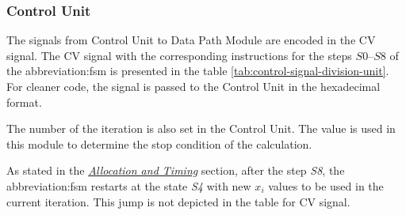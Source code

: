 \documentclass[a4paper, twoside, 11pt]{article}
\newcommand{\fbar}{\FloatBarrier}
\begin{document}
\fbar
\subsubsection{Control Unit}\label{subsubsec:division-control-unit}
The signals from Control Unit to Data Path Module are encoded in the CV signal. The CV signal with the corresponding instructions for the steps $S0$–$S8$ of the \gls{abbreviation:fsm} is presented in the table \ref{tab:control-signal-division-unit}. For cleaner code, the signal is passed to the Control Unit in the hexadecimal format.\par
The number of the iteration is also set in the Control Unit. The value is used in this module to determine the stop condition of the calculation.\par
As stated in the \hyperref[subsubsec:division-allocation-and-timing]{\textit{Allocation and Timing}} section, after the step \textit{S8}, the \gls{abbreviation:fsm} restarts at the state \textit{S4} with new $x_i$ values to be used in the current iteration. This jump is not depicted in the table for CV signal.
\end{document}
